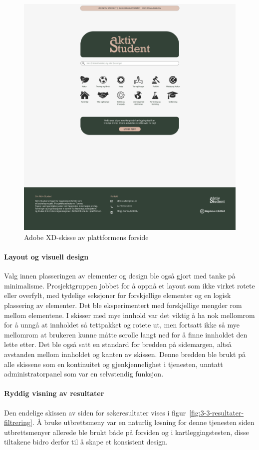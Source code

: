 \begin{figure}[H]
\centering
\includegraphics[width=.7\textwidth]{Illustrasjoner/Skisser-pdf/3.0/3-1-forside.pdf}
\caption{Adobe XD-skisse av plattformens forside}
\label{fig:3-1-forside}
\end{figure}

\paragraph{Layout og visuell design}
Valg innen plasseringen av elementer og design ble også gjort med tanke på minimalisme. Prosjektgruppen jobbet for å oppnå et layout som ikke virket rotete eller overfylt, med tydelige seksjoner for forskjellige elementer og en logisk plassering av elementer. Det ble eksperimentert med forskjellige mengder rom mellom elementene. I skisser med mye innhold var det viktig å ha nok mellomrom for å unngå at innholdet så tettpakket og rotete ut, men fortsatt ikke så mye mellomrom at brukeren kunne måtte scrolle langt ned for å finne innholdet den lette etter. Det ble også satt en standard for bredden på sidemargen, altså avstanden mellom innholdet og kanten av skissen. Denne bredden ble brukt på alle skissene som en kontinuitet og gjenkjennelighet i tjenesten, unntatt administratorpanel som var en selvstendig funksjon.

\paragraph{Ryddig visning av resultater}
Den endelige skissen av siden for søkeresultater vises i figur~\ref{fig:3-3-resultater-filtrering}. Å bruke utbrettsmeny var en naturlig løsning for denne tjenesten siden utbrettsmenyer allerede ble brukt både på forsiden og i kartleggingstesten, disse tiltakene bidro derfor til å skape et konsistent design.  


